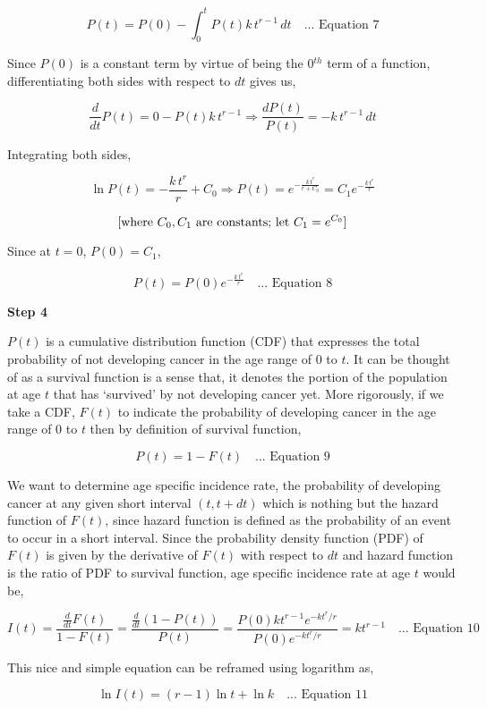 \documentclass[lineno,sn-basic, Numbered]{sn-jnl}%
\theoremstyle{thmstyleone}%
\theoremstyle{thmstyletwo}%
\theoremstyle{thmstylethree}%
\begin{document}
\[
P(t) = P(0) - \int_0^t P(t) k \, t^{r-1} \, dt \quad \text{... Equation 7}
\]

Since \( P(0) \) is a constant term by virtue of being the 0\(^{th}\) term of a function, differentiating both sides with respect to \( dt \) gives us,

\[
\frac{d}{dt} P(t) = 0 - P(t) k \, t^{r-1} \Rightarrow \frac{dP(t)}{P(t)} = - k \, t^{r-1} \, dt
\]

Integrating both sides,

\[
\ln P(t) = -\frac{k \, t^r}{r} + C_0 \Rightarrow P(t) = e^{-\frac{k \, t^r}{r + C_0}} = C_1 e^{-\frac{k \, t^r}{r}}
\]

\[ \text{[where \( C_0, C_1 \) are constants; let \( C_1 = e^{C_0} \)]} \]

Since at \( t = 0 \), \( P(0) = C_1 \),

\[
P(t) = P(0) e^{-\frac{k \, t^r}{r}} \quad \text{... Equation 8}
\]

\textbf{Step 4}

\( P(t) \) is a cumulative distribution function (CDF) that expresses the total probability of not developing cancer in the age range of 0 to \( t \). It can be thought of as a survival function is a sense that, it denotes the portion of the population at age \( t \) that has ‘survived’ by not developing cancer yet. More rigorously, if we take a CDF, \( F(t) \) to indicate the probability of developing cancer in the age range of 0 to \( t \) then by definition of survival function, 

\[ P(t) = 1 - F(t) \quad \text{... Equation 9} \]

We want to determine age specific incidence rate, the probability of developing cancer at any given short interval \( (t, t + dt) \) which is nothing but the hazard function of \( F(t) \), since hazard function is defined as the probability of an event to occur in a short interval. Since the probability density function (PDF) of \( F(t) \) is given by the derivative of \( F(t) \) with respect to \( dt \) and hazard function is the ratio of PDF to survival function, age specific incidence rate at age \( t \) would be,

\[ I(t) =  \frac{\frac{d}{dt} F(t)}{1 - F(t)}  =   \frac{\frac{d}{dt}(1 - P(t))}{P(t)}  = \frac{P(0) k t^{r-1} e^{- k t^r / r}}{P(0) e^{- k t^r / r}} = k t^{r-1} \quad \text{... Equation 10} \]

This nice and simple equation can be reframed using logarithm as,

\[ \ln I(t) = (r - 1) \ln t + \ln k \quad \text{... Equation 11} \]
\end{document}
